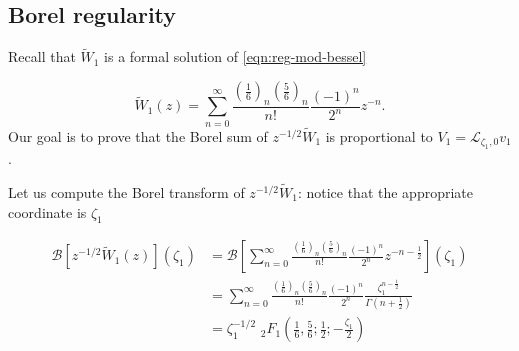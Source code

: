 \documentclass{article}
\theoremstyle{definition}
\newcommand{\laplace}{\mathcal{L}}
\newcommand{\borel}{\mathcal{B}}
\begin{document}
\subsection{Borel regularity}\label{bessel-regularity}
Recall that $\tilde{W}_1$ is a formal solution of \eqref{eqn:reg-mod-bessel}

\begin{equation}
\tilde{W}_1(z)=\sum_{n=0}^{\infty}\frac{\left(\frac{1}{6}\right)_n\left(\frac{5}{6}\right)_n}{n!}\frac{(-1)^n}{2^n}z^{-n}.
\end{equation}
Our goal is to prove that the Borel sum of $z^{-1/2}\tilde{W}_1$ is proportional to $V_1=\laplace_{\zeta_1,0}v_1$. 
%
%
%
%

Let us compute the Borel transform of $z^{-1/2}\tilde{W}_1$: notice that the appropriate coordinate is $\zeta_1$ 

\begin{align*}
\borel\left[z^{-1/2}\tilde{W}_1(z)\right](\zeta_1)&=\borel\left[\sum_{n=0}^{\infty}\frac{\left(\frac{1}{6}\right)_n\left(\frac{5}{6}\right)_n}{n!}\frac{(-1)^n}{2^n}z^{-n-\frac{1}{2}} \right](\zeta_1)\\
&=\sum_{n=0}^{\infty}\frac{\left(\frac{1}{6}\right)_n\left(\frac{5}{6}\right)_n}{n!}\frac{(-1)^n}{2^n}\frac{\zeta_1^{n-\frac{1}{2}}}{\Gamma(n+\frac{1}{2})}\\
&=\zeta_1^{-1/2}\,\, {}_2F_1\left(\frac{1}{6},\frac{5}{6};\frac{1}{2};-\frac{\zeta_1}{2}\right)
\end{align*}
\end{document}
